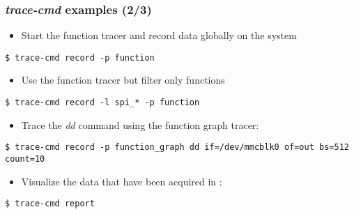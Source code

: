 \begin{frame}[fragile]
  \frametitle{{\em trace-cmd} examples (2/3)}
  \begin{itemize}
    \item Start the function tracer and record data globally on the system
  \end{itemize}
  \begin{block}{}
    \begin{verbatim}
$ trace-cmd record -p function
    \end{verbatim}
  \end{block}

  \begin{itemize}
    \item Use the function tracer but filter only  functions
  \end{itemize}
  \begin{block}{}
    \begin{verbatim}
$ trace-cmd record -l spi_* -p function
    \end{verbatim}
  \end{block}

  \begin{itemize}
    \item Trace the {\em dd} command using the function graph tracer:
  \end{itemize}
  \begin{block}{}
    \begin{verbatim}
$ trace-cmd record -p function_graph dd if=/dev/mmcblk0 of=out bs=512 count=10
    \end{verbatim}
  \end{block}

  \begin{itemize}
    \item Visualize the data that have been acquired in :
  \end{itemize}
  \begin{block}{}
    \begin{verbatim}
$ trace-cmd report
    \end{verbatim}
  \end{block}
\end{frame}

